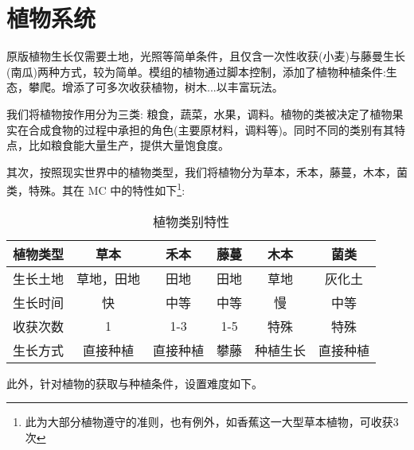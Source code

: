 \section{植物系统}

原版植物生长仅需要土地，光照等简单条件，且仅含一次性收获(小麦)与藤曼生长(南瓜)两种方式，较为简单。模组的植物通过脚本控制，添加了植物种植条件:生态，攀爬。增添了可多次收获植物，树木...以丰富玩法。

我们将植物按作用分为三类: 粮食，蔬菜，水果，调料。植物的类被决定了植物果实在合成食物的过程中承担的角色(主要原材料，调料等)。同时不同的类别有其特点，比如粮食能大量生产，提供大量饱食度。

其次，按照现实世界中的植物类型，我们将植物分为草本，禾本，藤蔓，木本，菌类，特殊。其在 MC 中的特性如下\footnote{此为大部分植物遵守的准则，也有例外，如香蕉这一大型草本植物，可收获3次}:

\begin{table}[H]
    \centering
    \caption{植物类别特性}
    \label{table:植物类别特性}
    \setlength{\tabcolsep}{4mm}
    \begin{tabular}{c|ccccc}
        \toprule
        \textbf{植物类型} & \textbf{草本} & \textbf{禾本} & \textbf{藤蔓} & \textbf{木本} & \textbf{菌类} \\
        \midrule
        生长土地          & 草地，田地    & 田地          & 田地          & 草地          & 灰化土        \\
        生长时间          & 快            & 中等          & 中等          & 慢            & 中等          \\
        收获次数          & 1             & 1-3           & 1-5           & 特殊          & 特殊          \\
        生长方式          & 直接种植      & 直接种植      & 攀藤          & 种植生长      & 直接种植      \\
        \bottomrule
    \end{tabular}
\end{table}

此外，针对植物的获取与种植条件，设置难度如下。


